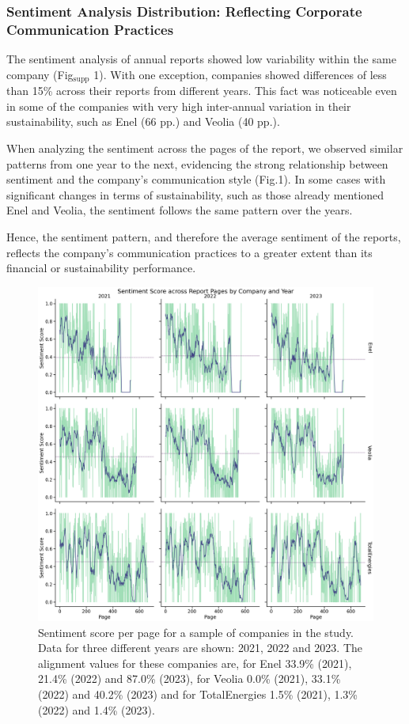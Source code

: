 \documentclass[times]{oupau}
\begin{document}
\subsubsection{Sentiment Analysis Distribution: Reflecting Corporate Communication Practices}
The sentiment analysis of annual reports showed low variability within the same company (Fig$_{\text{supp}}$ 1). With one exception, companies showed differences of less than 15\% across their reports from different years. This fact was noticeable even in some of the companies with very high inter-annual variation in their sustainability, such as Enel (66 pp.) and Veolia (40 pp.).
\par
\justify

When analyzing the sentiment across the pages of the report, we observed similar patterns from one year to the next, evidencing the strong relationship between sentiment and the company's communication style (Fig.1). In some cases with significant changes in terms of sustainability, such as those already mentioned Enel and Veolia, the sentiment follows the same pattern over the years.
\par
\justify
Hence, the sentiment pattern, and therefore the average sentiment of the reports, reflects the company's communication practices to a greater extent than its financial or sustainability performance.
\par
\justify


\begin{figure}
    \centering
    \includegraphics[width=1\linewidth]{pages1.png}
    \caption{Sentiment score per page for a sample of companies in the study. Data for three different years are shown: 2021, 2022 and 2023. The alignment values for these companies are, for Enel 33.9\% (2021), 21.4\% (2022) and 87.0\% (2023), for Veolia 0.0\% (2021), 33.1\% (2022) and 40.2\% (2023) and for TotalEnergies 1.5\% (2021), 1.3\% (2022) and 1.4\% (2023).}
    \label{fig:enter-label}
\end{figure}
\end{document}
